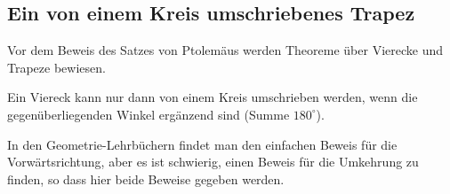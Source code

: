 \subsection{Ein von einem Kreis umschriebenes Trapez}\label{s.circumscribed}

Vor dem Beweis des Satzes von Ptolemäus werden Theoreme über Vierecke und Trapeze bewiesen.

\begin{theorem}\label{thm.quad-circum}
Ein Viereck kann nur dann von einem Kreis umschrieben werden, wenn die gegenüberliegenden Winkel ergänzend sind (Summe $180^\circ$).
\end{theorem}

In den Geometrie-Lehrbüchern findet man den einfachen Beweis für die Vorwärtsrichtung, aber es ist schwierig, einen Beweis für die Umkehrung zu finden, so dass hier beide Beweise gegeben werden.

